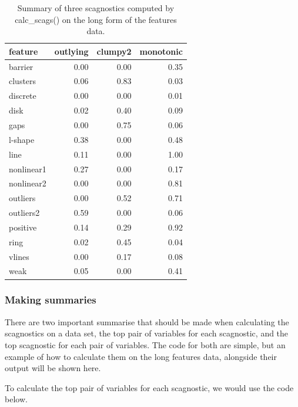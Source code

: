 \begin{Schunk}
\begin{table}

\caption{\label{tab:featuresscags-pdf}Summary of three scagnostics computed by calc\_scags() on the long form of the features data.}
\centering
\begin{tabular}[t]{>{\raggedright\arraybackslash}p{3cm}rrr}
\toprule
feature & outlying & clumpy2 & monotonic\\
\midrule
barrier & 0.00 & 0.00 & 0.35\\
clusters & 0.06 & 0.83 & 0.03\\
discrete & 0.00 & 0.00 & 0.01\\
disk & 0.02 & 0.40 & 0.09\\
gaps & 0.00 & 0.75 & 0.06\\
\addlinespace
l-shape & 0.38 & 0.00 & 0.48\\
line & 0.11 & 0.00 & 1.00\\
nonlinear1 & 0.27 & 0.00 & 0.17\\
nonlinear2 & 0.00 & 0.00 & 0.81\\
outliers & 0.00 & 0.52 & 0.71\\
\addlinespace
outliers2 & 0.59 & 0.00 & 0.06\\
positive & 0.14 & 0.29 & 0.92\\
ring & 0.02 & 0.45 & 0.04\\
vlines & 0.00 & 0.17 & 0.08\\
weak & 0.05 & 0.00 & 0.41\\
\bottomrule
\end{tabular}
\end{table}

\end{Schunk}

\hypertarget{making-summaries}{%
\subsubsection{Making summaries}\label{making-summaries}}

There are two important summarise that should be made when calculating
the scagnostics on a data set, the top pair of variables for each
scagnostic, and the top scagnostic for each pair of variables. The code
for both are simple, but an example of how to calculate them on the long
features data, alongside their output will be shown here.

To calculate the top pair of variables for each scagnostic, we would use
the code below.

